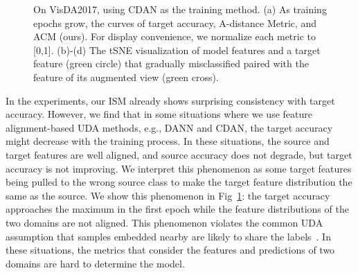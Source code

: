 \documentclass{article} %
\begin{document}
\begin{figure}[t]
\vspace{-6mm}
	\centering
        \hspace{0.02\textwidth}
        \hspace{0.02\textwidth}
        \hspace{0.02\textwidth}
    \caption{On VisDA2017, using CDAN as the training method. (a) As training epochs grow, the curves of target accuracy, A-distance Metric, and ACM (ours). For display convenience, we normalize each metric to [0,1]. (b)-(d) The tSNE visualization of model features and a target feature (green circle) that gradually misclassified paired with the feature of its augmented view (green cross).}
\label{fig:conclusion-input}
\vspace{-4mm}
\end{figure}

In the experiments, our ISM already shows surprising consistency with target accuracy. However, we find that in some situations where we use feature alignment-based UDA methods, e.g., DANN and CDAN, the target accuracy might decrease with the training process. In these situations, the source and target features are well aligned, and source accuracy does not degrade, but target accuracy is not improving. We interpret this phenomenon as some target features being pulled to the wrong source class to make the target feature distribution the same as the source. We show this phenomenon in Fig~\ref{fig:conclusion-input}: the target accuracy approaches the maximum in the first epoch while the feature distributions of the two domains are not aligned. This phenomenon violates the common UDA assumption that samples embedded nearby are likely to share the labels~\cite{SND}. In these situations, the metrics that consider the features and predictions of two domains are hard to determine the model.
\end{document}
